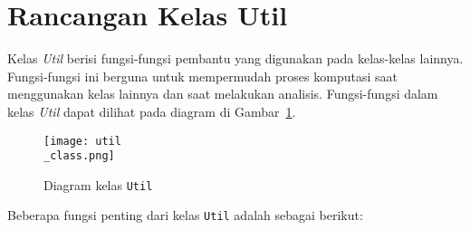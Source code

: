\section{Rancangan Kelas Util}
Kelas \textit{Util} berisi fungsi-fungsi pembantu yang digunakan pada kelas-kelas lainnya. Fungsi-fungsi ini berguna untuk mempermudah proses komputasi saat menggunakan kelas lainnya dan saat melakukan analisis. Fungsi-fungsi dalam kelas \textit{Util} dapat dilihat pada diagram di Gambar~\ref{fig:util_class}.
\vspace{-5pt}
\begin{figure}[H]
	\centering
	\texttt{[image: util\\\_class.png]}
	\caption{Diagram kelas \texttt{Util}}
	\label{fig:util_class}
\end{figure}
\vspace{-10pt}
Beberapa fungsi penting dari kelas \texttt{Util} adalah sebagai berikut:
